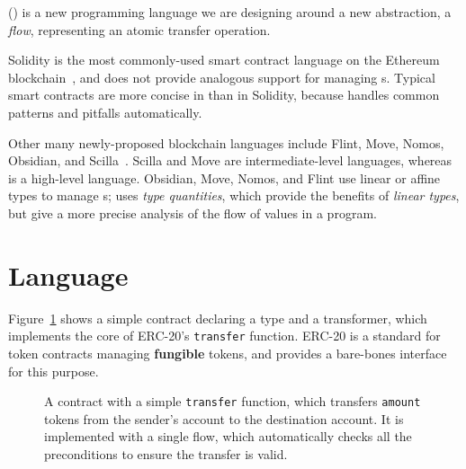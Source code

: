 \documentclass[nonacm, dvipsnames, sigconf]{acmart}
\begin{document}
\langName (\langNamePronounce) is a new programming language we are designing around a new abstraction, a \emph{flow}, representing an atomic transfer operation.

Solidity is the most commonly-used smart contract language on the Ethereum blockchain~\cite{EthereumForDevs}, and does not provide analogous support for managing \assetTxt{}s.
Typical smart contracts are more concise in \langName than in Solidity, because \langName handles common patterns and pitfalls automatically.

Other many newly-proposed blockchain languages include Flint, Move, Nomos, Obsidian, and Scilla~\cite{schrans2018flint, blackshear2019move, das2019nomos, coblenz2019obsidian, sergey2019scilla}.
Scilla and Move are intermediate-level languages, whereas \langName is a high-level language.
Obsidian, Move, Nomos, and Flint use linear or affine types to manage \assetTxt{}s; \langName uses \emph{type quantities}, which provide the benefits of \emph{linear types}, but give a more precise analysis of the flow of values in a program.

\section{Language}\label{sec:lang}
Figure~\ref{fig:erc20-transfer-flow} shows a simple contract declaring a type and a transformer, which implements the core of ERC-20's \lstinline{transfer} function.
ERC-20 is a standard for token contracts managing \textbf{fungible} tokens, and provides a bare-bones interface for this purpose.
\begin{figure}
    \centering
    
    \vspace{-1em}
    \caption{A \langName contract with a simple \lstinline{transfer} function, which transfers \lstinline{amount} tokens from the sender's account to the destination account.
It is implemented with a single flow, which automatically checks all the preconditions to ensure the transfer is valid.}
    \label{fig:erc20-transfer-flow}
\end{figure}
\end{document}
